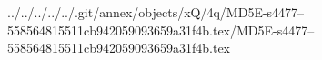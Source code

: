 ../../../../../.git/annex/objects/xQ/4q/MD5E-s4477--558564815511cb942059093659a31f4b.tex/MD5E-s4477--558564815511cb942059093659a31f4b.tex